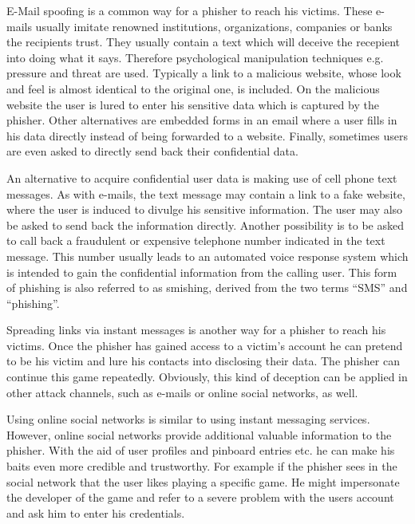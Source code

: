 \label{s:attack_channels}
\begin{description}[leftmargin=0cm]
	\item[E-Mail] E-Mail spoofing is a common way for a phisher to reach his victims.
 These e-mails usually imitate renowned institutions, organizations, companies or banks the recipients trust.
 They usually contain a text which will deceive the recepient into doing what it says. Therefore psychological manipulation techniques e.g. pressure and threat are used.
 Typically a link to a malicious website, whose look and feel is almost identical to the original one, is included.
 On the malicious website the user is lured to enter his sensitive data which is captured by the phisher.
 Other alternatives are embedded forms in an email where a user fills in his data directly instead of being forwarded to a website.
 Finally, sometimes users are even asked to directly send back their confidential data.

	\item[SMS] An alternative to acquire confidential user data is making use of cell phone text messages.
 As with e-mails, the text message may contain a link to a fake website, where the user is induced to divulge his sensitive information.
 The user may also be asked to send back the information directly.
 Another possibility is to be asked to call back a fraudulent or expensive telephone number indicated in the text message.
 This number usually leads to an automated voice response system which is intended to gain the confidential information from the calling user.
 This form of phishing is also referred to as smishing, derived from the two terms ``SMS'' and ``phishing''.

	\item[Instant Messaging] Spreading links via instant messages is another way for a phisher to reach his victims. Once the phisher has gained access to a victim's account he can pretend to be his victim and lure his contacts into disclosing their data. The phisher can continue this game repeatedly.
Obviously, this kind of deception can be applied in other attack channels, such as e-mails or online social networks, as well.
 
	\item[Online Social Networks] Using online social networks is similar to using instant messaging services.
 However, online social networks provide additional valuable information to the phisher.
 With the aid of user profiles and pinboard entries etc.
 he can make his baits even more credible and trustworthy. For example if the phisher sees in the social network that the user likes playing a specific game. He might impersonate the developer of the game and refer to a severe problem with the users account and ask him to enter his credentials. 


\end{description}
